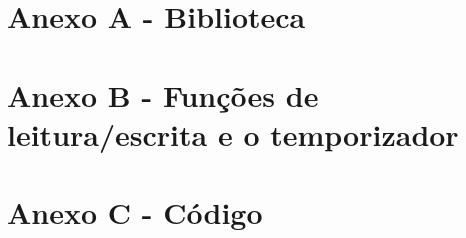 \section*{Anexo A - Biblioteca}




\newpage
\section*{Anexo B - Funções de leitura/escrita e o temporizador}



\newpage
\section*{Anexo C - Código}

